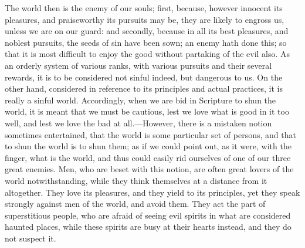 The world then is the enemy of our souls; first, because, however
innocent its pleasures, and praiseworthy its pursuits may be, they are
likely to engross us, unless we are on our guard: and secondly,
because in all its best pleasures, and noblest pursuits, the seeds of
sin have been sown; an enemy hath done this; so that it is most
difficult to enjoy the good without partaking of the evil also. As an
orderly system of various ranks, with various pursuits and their
several rewards, it is to be considered not sinful indeed, but
dangerous to us. On the other hand, considered in reference to its
principles and actual practices, it is really a sinful world.
Accordingly, when we are bid in Scripture to shun the world, it is
meant that we must be cautious, lest we love what is good in it too
well, and lest we love the bad at all.—However, there is a mistaken
notion sometimes entertained, that the world is some particular set of
persons, and that to shun the world is to shun them; as if we could
point out, as it were, with the finger, what is the world, and thus
could easily rid ourselves of one of our three great enemies. Men, who
are beset with this notion, are often great lovers of the world
notwithstanding, while they think themselves at a distance from it
altogether. They love its pleasures, and they yield to its principles,
yet they speak strongly against men of the world, and avoid them. They
act the part of superstitious people, who are afraid of seeing evil
spirits in what are considered haunted places, while these spirits are
busy at their hearts instead, and they do not suspect it.

